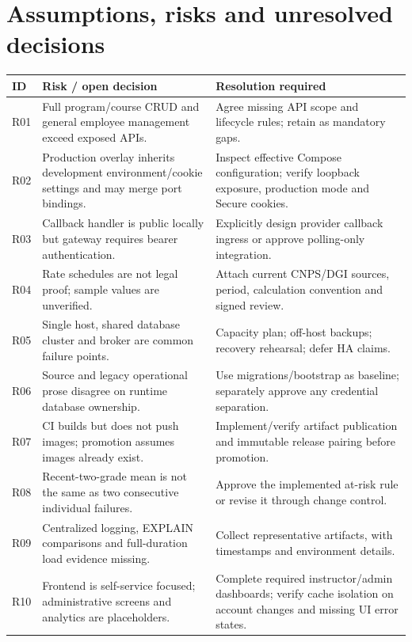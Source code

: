 \documentclass[10pt,a4paper]{article}
\begin{document}
\section{Assumptions, risks and unresolved decisions}
\begin{tabularx}{\textwidth}{@{}L{12mm}Y Y@{}}
\toprule ID & Risk / open decision & Resolution required\\\midrule
R01 & Full program/course CRUD and general employee management exceed exposed APIs. & Agree missing API scope and lifecycle rules; retain as mandatory gaps.\\
R02 & Production overlay inherits development environment/cookie settings and may merge port bindings. & Inspect effective Compose configuration; verify loopback exposure, production mode and Secure cookies.\\
R03 & Callback handler is public locally but gateway requires bearer authentication. & Explicitly design provider callback ingress or approve polling-only integration.\\
R04 & Rate schedules are not legal proof; sample values are unverified. & Attach current CNPS/DGI sources, period, calculation convention and signed review.\\
R05 & Single host, shared database cluster and broker are common failure points. & Capacity plan; off-host backups; recovery rehearsal; defer HA claims.\\
R06 & Source and legacy operational prose disagree on runtime database ownership. & Use migrations/bootstrap as baseline; separately approve any credential separation.\\
R07 & CI builds but does not push images; promotion assumes images already exist. & Implement/verify artifact publication and immutable release pairing before promotion.\\
R08 & Recent-two-grade mean is not the same as two consecutive individual failures. & Approve the implemented at-risk rule or revise it through change control.\\
R09 & Centralized logging, EXPLAIN comparisons and full-duration load evidence missing. & Collect representative artifacts, with timestamps and environment details.\\
R10 & Frontend is self-service focused; administrative screens and analytics are placeholders. & Complete required instructor/admin dashboards; verify cache isolation on account changes and missing UI error states.\\
\bottomrule
\end{tabularx}
\end{document}
